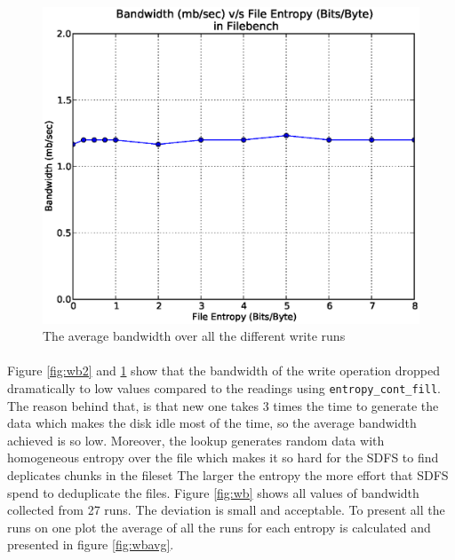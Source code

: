 \begin{figure}[H]
\begin{center}
\includegraphics[scale=.55]{../results/set2/write_bw_avg_2.eps}
\caption{The average bandwidth over all the different write runs}
\label{fig:wbavg2}
\end{center}
\end{figure}
\paragraph{}
Figure \ref{fig:wb2} and \ref{fig:wbavg2} show that the bandwidth of the write operation dropped dramatically to low values compared to the readings using \verb+entropy_cont_fill+. The reason behind that, is that new one takes 3 times the time to generate the data which makes the disk idle most of the time, so the average bandwidth achieved is so low. Moreover, the lookup generates random data with homogeneous entropy over the file which makes it so hard for the SDFS to find deplicates chunks in the fileset
The larger the entropy the more effort that SDFS spend to deduplicate the files. Figure \ref{fig:wb} shows all values of bandwidth collected from 27 runs. The deviation is small and acceptable. To present all the runs on one plot the average of all the runs for each entropy is calculated and presented in figure \ref{fig:wbavg}.

